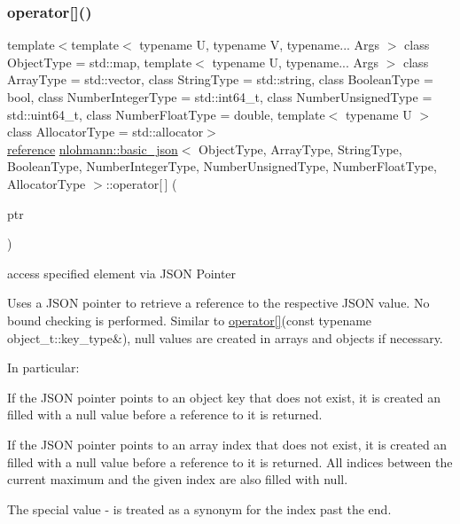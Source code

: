 \subsubsection{\texorpdfstring{operator[]()}{operator[]()}\hspace{0.1cm}{\footnotesize\ttfamily [9/10]}}
{\footnotesize\ttfamily template$<$template$<$ typename U, typename V, typename... Args $>$ class Object\+Type = std\+::map, template$<$ typename U, typename... Args $>$ class Array\+Type = std\+::vector, class String\+Type  = std\+::string, class Boolean\+Type  = bool, class Number\+Integer\+Type  = std\+::int64\+\_\+t, class Number\+Unsigned\+Type  = std\+::uint64\+\_\+t, class Number\+Float\+Type  = double, template$<$ typename U $>$ class Allocator\+Type = std\+::allocator$>$ \\
\hyperlink{classnlohmann_1_1basic__json_a3ec8e17be8732fe436e9d6733f52b7a3}{reference} \hyperlink{classnlohmann_1_1basic__json}{nlohmann\+::basic\+\_\+json}$<$ Object\+Type, Array\+Type, String\+Type, Boolean\+Type, Number\+Integer\+Type, Number\+Unsigned\+Type, Number\+Float\+Type, Allocator\+Type $>$\+::operator\mbox{[}$\,$\mbox{]} (\begin{DoxyParamCaption}\item[{const \hyperlink{classnlohmann_1_1basic__json_1_1json__pointer}{json\+\_\+pointer} \&}]{ptr }\end{DoxyParamCaption})\hspace{0.3cm}{\ttfamily [inline]}}



access specified element via J\+S\+ON Pointer 

Uses a J\+S\+ON pointer to retrieve a reference to the respective J\+S\+ON value. No bound checking is performed. Similar to \hyperlink{classnlohmann_1_1basic__json_a59732a1de287a7301cca19a7a7748159}{operator\mbox{[}\mbox{]}}(const typename object\+\_\+t\+::key\+\_\+type\&), {\ttfamily null} values are created in arrays and objects if necessary.

In particular\+:
\begin{DoxyItemize}
\item If the J\+S\+ON pointer points to an object key that does not exist, it is created an filled with a {\ttfamily null} value before a reference to it is returned.
\item If the J\+S\+ON pointer points to an array index that does not exist, it is created an filled with a {\ttfamily null} value before a reference to it is returned. All indices between the current maximum and the given index are also filled with {\ttfamily null}.
\item The special value {\ttfamily -\/} is treated as a synonym for the index past the end.
\end{DoxyItemize}


